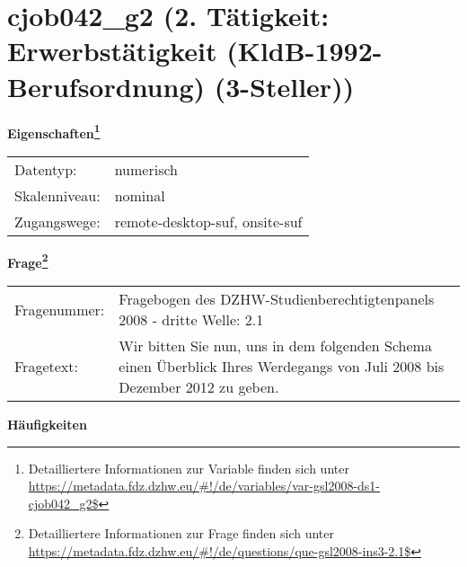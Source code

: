 
    \setcounter{footnote}{0}

    \vspace*{-1.8cm}
	\section{cjob042\_g2 (2. Tätigkeit: Erwerbstätigkeit (KldB-1992-Berufsordnung) (3-Steller))}
	\label{section:cjob042_g2}



    \vspace*{0.5cm}
    \noindent\textbf{Eigenschaften\footnote{Detailliertere Informationen zur Variable finden sich unter
		\url{https://metadata.fdz.dzhw.eu/\#!/de/variables/var-gsl2008-ds1-cjob042_g2$}}}\\
	\begin{tabularx}{\hsize}{@{}lX}
	Datentyp: & numerisch \\
	Skalenniveau: & nominal \\
	Zugangswege: &
	  remote-desktop-suf, 
	  onsite-suf
 \\
    \end{tabularx}



				\vspace*{0.5cm}
                \noindent\textbf{Frage\footnote{Detailliertere Informationen zur Frage finden sich unter
		              \url{https://metadata.fdz.dzhw.eu/\#!/de/questions/que-gsl2008-ins3-2.1$}}}\\
				\begin{tabularx}{\hsize}{@{}lX}
					Fragenummer: &
					  Fragebogen des DZHW-Studienberechtigtenpanels 2008 - dritte Welle:
					  2.1
 \\
					Fragetext: & Wir bitten Sie nun, uns in dem folgenden Schema einen Überblick Ihres Werdegangs von Juli 2008 bis Dezember 2012 zu geben. \\
				\end{tabularx}





        		\vspace*{0.5cm}
                \noindent\textbf{Häufigkeiten}

